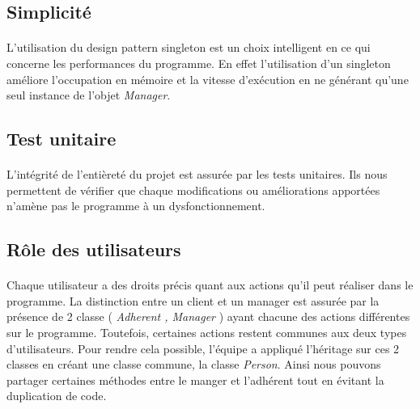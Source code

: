 \subsection{Simplicité}
    \paragraph{}
        L'utilisation du design pattern singleton est un choix intelligent en ce qui concerne les performances du programme.
        En effet l'utilisation d'un singleton améliore l'occupation en mémoire et la vitesse d'exécution en ne générant qu'une seul instance de l'objet \textit{Manager}.
        
\vspace{\baselineskip}       
\subsection{Test unitaire}
    \paragraph{}
        L'intégrité de l'entièreté du projet est assurée par les tests unitaires. Ils nous permettent de vérifier que chaque modifications ou améliorations apportées n'amène pas le programme à un dysfonctionnement.

\vspace{\baselineskip}       
\subsection{Rôle des utilisateurs}
    \paragraph{}
        Chaque utilisateur a des droits précis quant aux actions qu'il peut réaliser dans le programme. La distinction entre un client et un manager est assurée par la présence de 2 classe ( \textit{Adherent , Manager} ) ayant chacune des actions différentes sur le programme. Toutefois, certaines actions restent communes aux deux types d'utilisateurs. Pour rendre cela possible, l'équipe a appliqué l'héritage sur ces 2 classes en créant une classe commune, la classe \textit{Person}. Ainsi nous pouvons partager certaines méthodes entre le manger et l'adhérent tout en évitant la duplication de code.